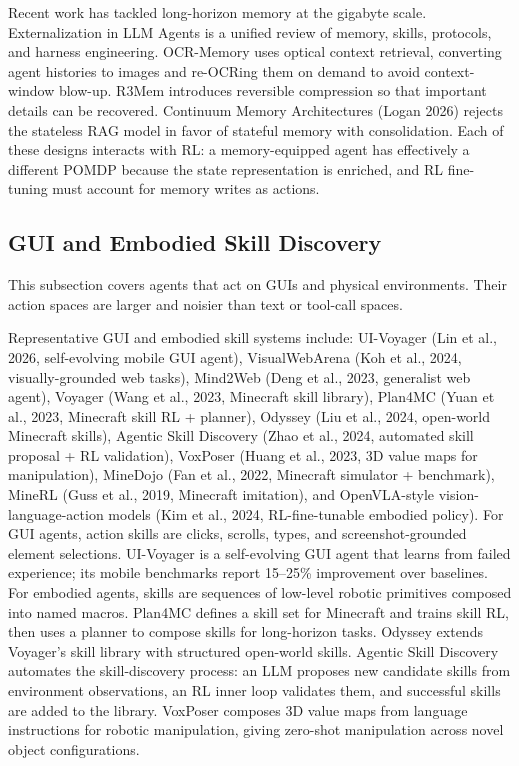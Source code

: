 \documentclass{article}
\begin{document}
Recent work has tackled long-horizon memory at the gigabyte scale. Externalization in LLM Agents \citep{zhou20262026} is a unified review of memory, skills, protocols, and harness engineering. OCR-Memory \citep{li20262026} uses optical context retrieval, converting agent histories to images and re-OCRing them on demand to avoid context-window blow-up. R3Mem \citep{wang20252025} introduces reversible compression so that important details can be recovered. Continuum Memory Architectures (Logan 2026) rejects the stateless RAG model in favor of stateful memory with consolidation. Each of these designs interacts with RL: a memory-equipped agent has effectively a different POMDP because the state representation is enriched, and RL fine-tuning must account for memory writes as actions.

\subsection{GUI and Embodied Skill Discovery}\label{gui-and-embodied-skill-discovery}

This subsection covers agents that act on GUIs and physical environments. Their action spaces are larger and noisier than text or tool-call spaces.

Representative GUI and embodied skill systems include: UI-Voyager (Lin et al., 2026, self-evolving mobile GUI agent), VisualWebArena (Koh et al., 2024, visually-grounded web tasks), Mind2Web (Deng et al., 2023, generalist web agent), Voyager (Wang et al., 2023, Minecraft skill library), Plan4MC (Yuan et al., 2023, Minecraft skill RL + planner), Odyssey (Liu et al., 2024, open-world Minecraft skills), Agentic Skill Discovery (Zhao et al., 2024, automated skill proposal + RL validation), VoxPoser (Huang et al., 2023, 3D value maps for manipulation), MineDojo (Fan et al., 2022, Minecraft simulator + benchmark), MineRL (Guss et al., 2019, Minecraft imitation), and OpenVLA-style vision-language-action models (Kim et al., 2024, RL-fine-tunable embodied policy). For GUI agents, action skills are clicks, scrolls, types, and screenshot-grounded element selections. UI-Voyager \citep{lin20262026} is a self-evolving GUI agent that learns from failed experience; its mobile benchmarks report 15--25\% improvement over baselines. For embodied agents, skills are sequences of low-level robotic primitives composed into named macros. Plan4MC \citep{yuan20232023} defines a skill set for Minecraft and trains skill RL, then uses a planner to compose skills for long-horizon tasks. Odyssey \citep{liu20242024} extends Voyager's skill library with structured open-world skills. Agentic Skill Discovery \citep{zhao2024agenticskilldiscov} automates the skill-discovery process: an LLM proposes new candidate skills from environment observations, an RL inner loop validates them, and successful skills are added to the library. VoxPoser \citep{huang20232023} composes 3D value maps from language instructions for robotic manipulation, giving zero-shot manipulation across novel object configurations.
\end{document}

